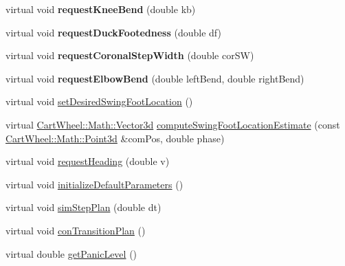 \begin{DoxyCompactItemize}
\item 
\hypertarget{classCartWheel_1_1Core_1_1CompositeBehaviourController_a3a3ca1185f82a6dbe93ce90c4bf7c927}{
virtual void {\bfseries requestKneeBend} (double kb)}
\label{classCartWheel_1_1Core_1_1CompositeBehaviourController_a3a3ca1185f82a6dbe93ce90c4bf7c927}

\item 
\hypertarget{classCartWheel_1_1Core_1_1CompositeBehaviourController_af6173fd84770673fe698989694440272}{
virtual void {\bfseries requestDuckFootedness} (double df)}
\label{classCartWheel_1_1Core_1_1CompositeBehaviourController_af6173fd84770673fe698989694440272}

\item 
\hypertarget{classCartWheel_1_1Core_1_1CompositeBehaviourController_a919f8ee108399554dbf290b2f13e6297}{
virtual void {\bfseries requestCoronalStepWidth} (double corSW)}
\label{classCartWheel_1_1Core_1_1CompositeBehaviourController_a919f8ee108399554dbf290b2f13e6297}

\item 
\hypertarget{classCartWheel_1_1Core_1_1CompositeBehaviourController_a384eca75453021ab3440cffeb36d53df}{
virtual void {\bfseries requestElbowBend} (double leftBend, double rightBend)}
\label{classCartWheel_1_1Core_1_1CompositeBehaviourController_a384eca75453021ab3440cffeb36d53df}

\item 
virtual void \hyperlink{classCartWheel_1_1Core_1_1CompositeBehaviourController_a5b0841672d1b94a3d3dbc51b2a5d0695}{setDesiredSwingFootLocation} ()
\item 
virtual \hyperlink{classCartWheel_1_1Math_1_1Vector3d}{CartWheel::Math::Vector3d} \hyperlink{classCartWheel_1_1Core_1_1CompositeBehaviourController_a956bb427f158690080f381bd9cf4a089}{computeSwingFootLocationEstimate} (const \hyperlink{classCartWheel_1_1Math_1_1Point3d}{CartWheel::Math::Point3d} \&comPos, double phase)
\item 
virtual void \hyperlink{classCartWheel_1_1Core_1_1CompositeBehaviourController_a48cc3421fce61716da9686c9a351ed78}{requestHeading} (double v)
\item 
virtual void \hyperlink{classCartWheel_1_1Core_1_1CompositeBehaviourController_a88c8eed10fb31f94b720e079348446bb}{initializeDefaultParameters} ()
\item 
virtual void \hyperlink{classCartWheel_1_1Core_1_1CompositeBehaviourController_afaba80fe489ca6a997e33551d94a6db1}{simStepPlan} (double dt)
\item 
virtual void \hyperlink{classCartWheel_1_1Core_1_1CompositeBehaviourController_a7fd8f2e351f4dd0fff087c8d254b998e}{conTransitionPlan} ()
\item 
virtual double \hyperlink{classCartWheel_1_1Core_1_1CompositeBehaviourController_a103f9b905e00d730a3b07eedad8c491d}{getPanicLevel} ()
\end{DoxyCompactItemize}


